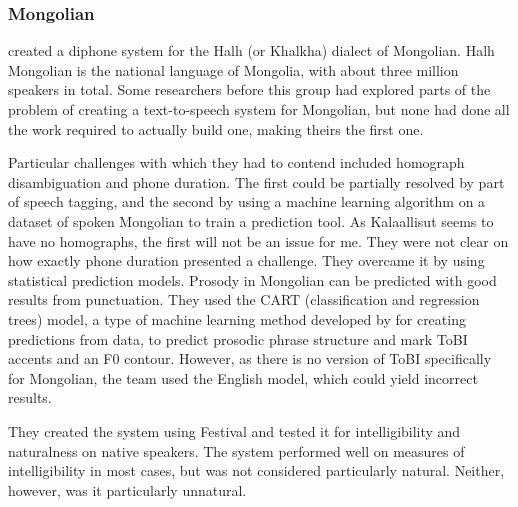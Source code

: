 \documentclass[12pt]{article}
\begin{document}
		\subsubsection{Mongolian}

		\citet{mongolian} created a diphone system for the Halh (or Khalkha) dialect of Mongolian. Halh Mongolian is the national language of Mongolia, with about three million speakers in total. Some researchers before this group had explored parts of the problem of creating a text-to-speech system for Mongolian, but none had done all the work required to actually build one, making theirs the first one. \par

		Particular challenges with which they had to contend included homograph disambiguation and phone duration. The first could be partially resolved by part of speech tagging, and the second by using a machine learning algorithm on a dataset of spoken Mongolian to train a prediction tool. As Kalaallisut seems to have no homographs, the first will not be an issue for me. They were not clear on how exactly phone duration presented a challenge. They overcame it by using statistical prediction models. Prosody in Mongolian can be predicted with good results from punctuation. They used the CART (classification and regression trees) model, a type of machine learning method developed by \citet{cart} for creating predictions from data, to predict prosodic phrase structure and mark ToBI accents and an F0 contour. However, as there is no version of ToBI specifically for Mongolian, the team used the English model, which could yield incorrect results.\par

		They created the system using Festival and tested it for intelligibility and naturalness on native speakers. The system performed well on measures of intelligibility in most cases, but was not considered particularly natural. Neither, however, was it particularly unnatural. \par
\end{document}
